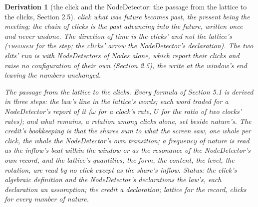 \documentclass[pdflatex,sn-mathphys-num]{sn-jnl}
\newcommand{\claimmark}[1]{\textup{\textsc{#1}}}
\theoremstyle{thmstyleone}
\newtheorem{derivation}{Derivation}
\begin{document}
\begin{derivation}[the click and the NodeDetector: the passage from the lattice to the clicks, Section 2.5]
click what was future becomes past, the present being the meeting; the chain of clicks is the past advancing into the future, written once and never undone. The direction of time is the clicks' and not the lattice's (\claimmark{theorem} for the step; the clicks' arrow the NodeDetector's declaration). The two slits' run is with NodeDetectors of Nodes alone, which report their clicks and raise no configuration of their own (Section 2.5), the write at the window's end leaving the numbers unchanged.

\emph{The passage from the lattice to the clicks.} Every formula of Section 5.1 is derived in three steps: the law's line in the lattice's words; each word traded for a NodeDetector's report of it ($\omega$ for a clock's rate, $U$ for the ratio of two clocks' rates); and what remains, a relation among clicks alone, set beside nature's. The credit's bookkeeping is that the shares sum to what the screen saw, one whole per click, the whole the NodeDetector's own transition; a frequency of nature is read as the inflow's beat within the window or as the resonance of the NodeDetector's own record, and the lattice's quantities, the form, the content, the level, the rotation, are read by no click except as the share's inflow. \emph{Status:} the click's algebraic definition and the NodeDetector's declarations the law's, each declaration an assumption; the credit a declaration; lattice for the record, clicks for every number of nature.
\end{derivation}
\end{document}
